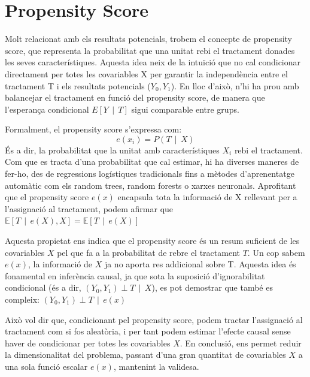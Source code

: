 \documentclass[../main.tex]{subfiles}
\begin{document}
    \section{Propensity Score}\label{sec:ps}
    Molt relacionat amb els resultats potencials, trobem el concepte de propensity score, que representa la probabilitat que una unitat rebi el tractament donades les seves característiques. Aquesta idea neix de la intuïció que no cal condicionar directament per totes les covariables X per garantir la independència entre el tractament T i els resultats potencials ($Y_0, Y_1$). En lloc d’això, n'hi ha prou amb balancejar el tractament en funció del propensity score, de manera que l'esperança condicional $E[Y\,\mid\,T]$ sigui comparable entre grups. \citep{facure2022} \par
    Formalment, el propensity score s’expressa com:
    \begin{equation}
        e(x_i)=P(T\,\mid\,X)
    \end{equation}
    És a dir, la probabilitat que la unitat amb característiques $X_i$ rebi el tractament.
    Com que es tracta d’una probabilitat que cal estimar, hi ha diverses maneres de fer-ho, des de regressions logístiques tradicionals fins a mètodes d’aprenentatge automàtic com els random trees, random forests o xarxes neuronals. 
    Aprofitant que el propensity score $e(x)$ encapsula tota la informació de X rellevant per a l’assignació al tractament, podem afirmar que $\mathbb{E}[T\,\mid\,e(X),X]=\mathbb{E}[T\,\mid\,e(X)]$ \par
    Aquesta propietat ens indica que el propensity score és un resum suficient de les covariables $X$ pel que fa a la probabilitat de rebre el tractament $T$. Un cop sabem $e(x)$, la informació de $X$ ja no aporta res addicional sobre T.
    Aquesta idea és fonamental en inferència causal, ja que sota la suposició d’ignorabilitat condicional (és a dir, $(Y_0,Y_1)\perp T\,\mid\,X$), es pot demostrar que també es compleix: $(Y_0,Y_1)\perp T\,\mid\,e(x)$ \par
    Això vol dir que, condicionant pel propensity score, podem tractar l'assignació al tractament com si fos aleatòria, i per tant podem estimar l’efecte causal sense haver de condicionar per totes les covariables $X$. En conclusió, ens permet reduir la dimensionalitat del problema, passant d’una gran quantitat de covariables $X$ a una sola funció escalar $e(x)$, mantenint la validesa.
    
\end{document}
